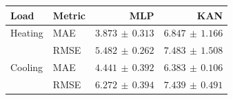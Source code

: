 \begin{center}
\small
\setlength{\tabcolsep}{4pt}
\begin{tabular}{@{}llrr@{}}
\toprule
Load & Metric & MLP & KAN\\
\midrule
Heating & MAE & $3.873\,\pm\,0.313$ & $6.847\,\pm\,1.166$\\
 & RMSE & $5.482\,\pm\,0.262$ & $7.483\,\pm\,1.508$\\
Cooling & MAE & $4.441\,\pm\,0.392$ & $6.383\,\pm\,0.106$\\
 & RMSE & $6.272\,\pm\,0.394$ & $7.439\,\pm\,0.491$\\
\bottomrule
\end{tabular}
\end{center}